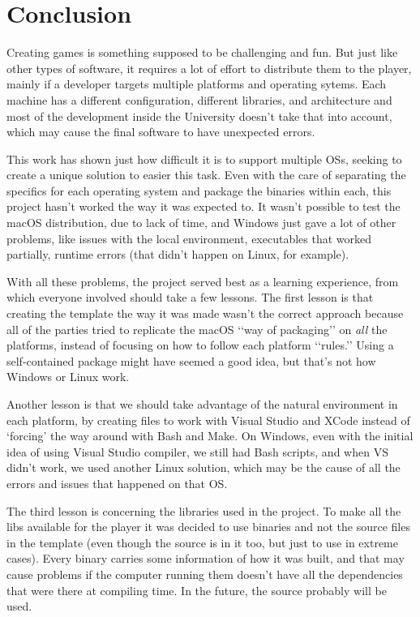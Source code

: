 \chapter{Conclusion}
\label{sec:conclusion}

Creating games is something supposed to be challenging and fun. But just like other types of software, it requires a lot of effort to distribute them to the player, mainly if a developer targets multiple platforms and operating sytems. Each machine has a different configuration, different libraries, and architecture and most of the development inside the University doesn't take that into account, which may cause the final software to have unexpected errors.

This work has shown just how difficult it is to support multiple OSs, seeking to create a unique solution to easier this task. Even with the care of separating the specifics for each operating system and package the binaries within each, this project hasn't worked the way it was expected to. It wasn't possible to test the macOS distribution, due to lack of time, and Windows just gave a lot of other problems, like issues with the local environment, executables that worked partially, runtime errors (that didn't happen on Linux, for example).

With all these problems, the project served best as a learning experience, from which everyone involved should take a few lessons. The first lesson is that creating the template the way it was made wasn't the correct approach because all of the parties tried to replicate the macOS \lq\lq way of packaging\rq\rq{} on \textit{all} the platforms, instead of focusing on how to follow each platform \lq\lq rules.\rq\rq{} Using a self-contained package might have seemed a good idea, but that's not how Windows or Linux work.

Another lesson is that we should take advantage of the natural environment in each platform, by creating files to work with Visual Studio and XCode instead of \lq forcing\rq{} the way around with Bash and Make. On Windows, even with the initial idea of using Visual Studio compiler, we still had Bash scripts, and when VS didn't work, we used another Linux solution, which may be the cause of all the errors and issues that happened on that OS.

The third lesson is concerning the libraries used in the project. To make all the libs available for the player it was decided to use binaries and not the source files in the template (even though the source is in it too, but just to use in extreme cases). Every binary carries some information of how it was built, and that may cause problems if the computer running them doesn't have all the dependencies that were there at compiling time. In the future, the source probably will be used.


